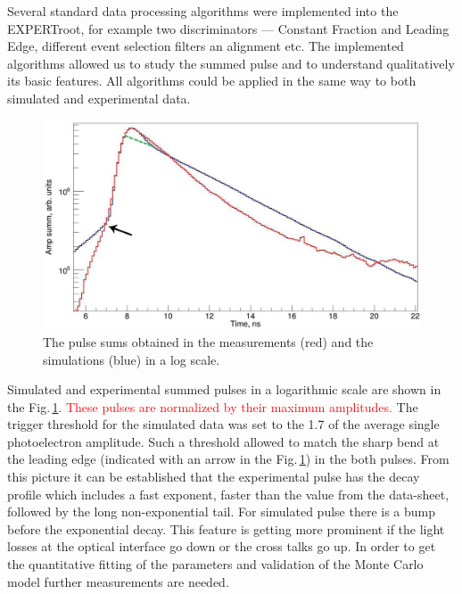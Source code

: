 \documentclass{webofc}
\newcommand{\er}{\textmd{EXPERTroot}}
\newcommand{\red}[1]{\textcolor{red}{#1}}
\begin{document}
Several standard data processing algorithms were implemented into the \er, for example two discriminators --- Constant Fraction and Leading Edge, different event selection filters an alignment etc. The implemented algorithms allowed us to study the summed pulse and to understand qualitatively its basic features. All algorithms could be applied in the same way to both simulated and experimental data.

\begin{figure}
	\includegraphics[width=\linewidth]{summ.png}
	\caption{The pulse sums obtained in the measurements (red) and the simulations (blue) in a log scale.}\label{ris:sum}
\end{figure}

Simulated and experimental summed pulses in a logarithmic scale are shown in the Fig.\,\ref{ris:sum}. \red{These pulses are normalized by their maximum amplitudes.}
The trigger threshold for the simulated data was set to the 1.7 of the average single photoelectron amplitude.
Such a threshold allowed to match the sharp bend at the leading edge (indicated with an arrow in the Fig.\,\ref{ris:sum}) in the both pulses. From this picture it can be established that the experimental pulse has the decay profile which includes a fast exponent, faster than the value from the data-sheet, followed by the long non-exponential tail. For simulated pulse there is a bump before the exponential decay. This feature is getting more prominent if the light losses at the optical interface go down or the cross talks go up. In order to get the quantitative fitting of the parameters and validation of the Monte Carlo model further measurements are needed. 
\end{document}
